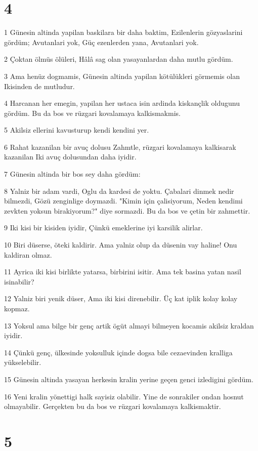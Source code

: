 \chapter{4}

\par 1 Günesin altinda yapilan baskilara bir daha baktim, Ezilenlerin gözyaslarini gördüm; Avutanlari yok, Güç ezenlerden yana, Avutanlari yok.
\par 2 Çoktan ölmüs ölüleri, Hâlâ sag olan yasayanlardan daha mutlu gördüm.
\par 3 Ama henüz dogmamis, Günesin altinda yapilan kötülükleri görmemis olan Ikisinden de mutludur.
\par 4 Harcanan her emegin, yapilan her ustaca isin ardinda kiskançlik oldugunu gördüm. Bu da bos ve rüzgari kovalamaya kalkismakmis.
\par 5 Akilsiz ellerini kavusturup kendi kendini yer.
\par 6 Rahat kazanilan bir avuç dolusu Zahmtle, rüzgari kovalamaya kalkisarak kazanilan Iki avuç dolusundan daha iyidir.
\par 7 Günesin altinda bir bos sey daha gördüm:
\par 8 Yalniz bir adam vardi, Oglu da kardesi de yoktu. Çabalari dinmek nedir bilmezdi, Gözü zenginlige doymazdi. "Kimin için çalisiyorum, Neden kendimi zevkten yoksun birakiyorum?" diye sormazdi. Bu da bos ve çetin bir zahmettir.
\par 9 Iki kisi bir kisiden iyidir, Çünkü emeklerine iyi karsilik alirlar.
\par 10 Biri düserse, öteki kaldirir. Ama yalniz olup da düsenin vay haline! Onu kaldiran olmaz.
\par 11 Ayrica iki kisi birlikte yatarsa, birbirini isitir. Ama tek basina yatan nasil isinabilir?
\par 12 Yalniz biri yenik düser, Ama iki kisi direnebilir. Üç kat iplik kolay kolay kopmaz.
\par 13 Yoksul ama bilge bir genç artik ögüt almayi bilmeyen kocamis akilsiz kraldan iyidir.
\par 14 Çünkü genç, ülkesinde yoksulluk içinde dogsa bile cezaevinden kralliga yükselebilir.
\par 15 Günesin altinda yasayan herkesin kralin yerine geçen genci izledigini gördüm.
\par 16 Yeni kralin yönettigi halk sayisiz olabilir. Yine de sonrakiler ondan hosnut olmayabilir. Gerçekten bu da bos ve rüzgari kovalamaya kalkismaktir.

\chapter{5}


